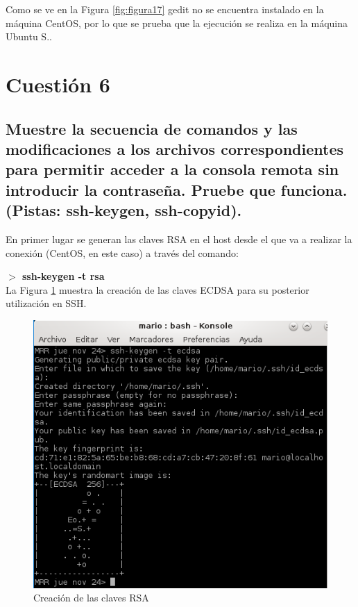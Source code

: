 Como se ve en la Figura \ref{fig:figura17} gedit no se encuentra instalado en la máquina CentOS,
por lo que se prueba que la ejecución se realiza en la máquina Ubuntu S..

\newpage

\section{Cuestión 6}
\subsection{Muestre la secuencia de comandos y las modificaciones a los
		archivos correspondientes para permitir acceder a la consola remota sin
		introducir la contraseña. Pruebe que funciona. (Pistas: ssh-keygen, ssh-copyid).}
	
En primer lugar se generan las claves RSA en el host desde el que va a realizar la conexión (CentOS, en este caso) a través del comando:

\textbf{$ > $ ssh-keygen -t rsa} \cite{enlace17}
\\

La Figura \ref{fig:figura97} muestra la creación de las claves ECDSA para su posterior utilización en SSH.

\begin{figure}[H] %
	\centering
	\includegraphics[scale=0.8]{figuras/figura97.png} 
	\caption{Creación de las claves RSA} 
	\label{fig:figura97}
\end{figure}

